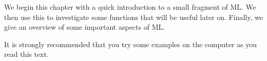 We begin this chapter with a quick introduction to a small fragment of
ML. We then use this to investigate some functions that will be useful later
on. Finally, we give an overview of some important aspects of ML.

It is strongly recommended that you try some examples on the computer
as you read this text.

\secup
